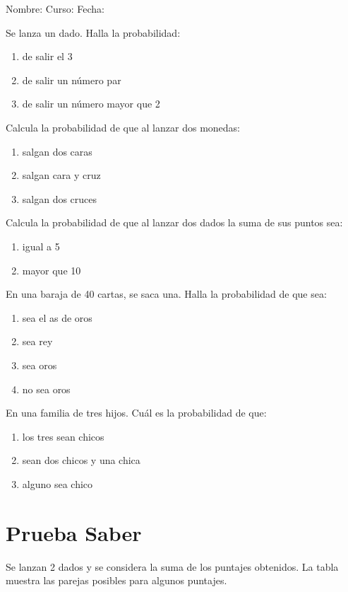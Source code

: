 \documentclass[letterpaper,fleqn]{article}
\newcommand{\LineaNombre}{%
\par
\vspace{\baselineskip}
Nombre:\hrulefill \; Curso: \underline{\hspace*{48pt}} \; Fecha: \underline{\hspace*{2.5cm}} \relax
\par}
\begin{document}
\LineaNombre
\begin{enumerate}
 \item Se lanza un dado. Halla la probabilidad:
 \begin{enumerate}
 \item de salir el 3 \noanswer
 \item de salir un número par \noanswer
 \item de salir un número mayor que 2 \noanswer
 \end{enumerate}
 \item Calcula la probabilidad de que al lanzar dos monedas:
 \begin{enumerate}
 \item salgan dos caras \noanswer
 \item salgan cara y cruz \noanswer 
 \item salgan dos cruces \noanswer
 \end{enumerate}
 \item Calcula la probabilidad de que al lanzar dos dados la suma de sus puntos sea:
 \begin{enumerate}
 \item igual a 5 \noanswer 
 \item mayor que 10 \noanswer
 \end{enumerate}
 \item En una baraja de 40 cartas, se saca una. Halla la probabilidad de que sea:
 \begin{enumerate}
 \item sea el as de oros  \noanswer
 \item sea rey \noanswer 
 \item sea oros
 \item no sea oros \noanswer
 \end{enumerate}
 \item En una familia de tres hijos. Cuál es la probabilidad de que:
 \begin{enumerate}
 \item los tres sean chicos \noanswer 
 \item sean dos chicos y una chica \noanswer 
 \item alguno sea chico \noanswer
 \end{enumerate}
 \section*{Prueba Saber}
 \begin{minipage}{.35\textwidth}
\item Se lanzan 2 dados y se considera la suma de los puntajes obtenidos. La tabla muestra las parejas posibles para algunos puntajes.  \\


\end{minipage}
\end{enumerate}
\end{document}
